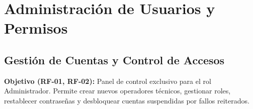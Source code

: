 \documentclass[12pt,a4paper]{report}
\begin{document}
\newpage
\chapter{Administración de Usuarios y Permisos}

\section{Gestión de Cuentas y Control de Accesos}

\textbf{Objetivo (RF-01, RF-02):} Panel de control exclusivo para el rol Administrador. Permite crear nuevos operadores técnicos, gestionar roles, restablecer contraseñas y desbloquear cuentas suspendidas por fallos reiterados.
\end{document}
